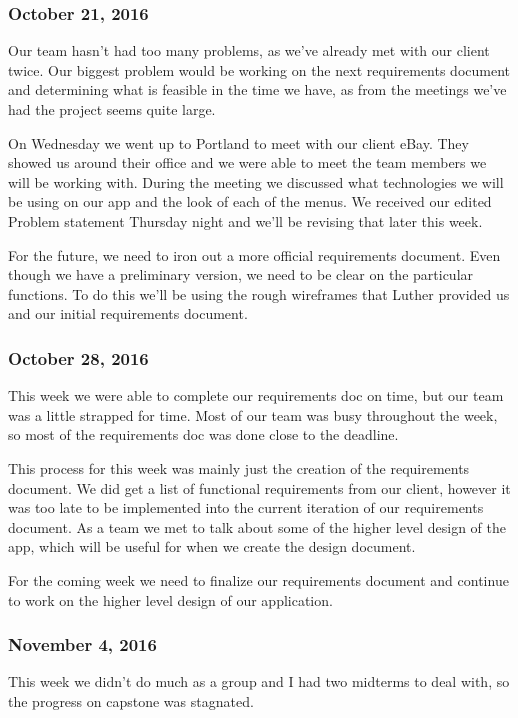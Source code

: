 \subsubsection{October 21, 2016}\label{section}
Our team hasn't had too many problems, as we've already met with our
client twice. Our biggest problem would be working on the next
requirements document and determining what is feasible in the time we
have, as from the meetings we've had the project seems quite large.

On Wednesday we went up to Portland to meet with our client eBay. They
showed us around their office and we were able to meet the team members
we will be working with. During the meeting we discussed what
technologies we will be using on our app and the look of each of the
menus. We received our edited Problem statement Thursday night and we'll
be revising that later this week.

For the future, we need to iron out a more official requirements
document. Even though we have a preliminary version, we need to be clear
on the particular functions. To do this we'll be using the rough
wireframes that Luther provided us and our initial requirements
document.

\subsubsection{October 28, 2016}\label{section}
This week we were able to complete our requirements doc on time, but our
team was a little strapped for time. Most of our team was busy
throughout the week, so most of the requirements doc was done close to
the deadline.

This process for this week was mainly just the creation of the
requirements document. We did get a list of functional requirements from
our client, however it was too late to be implemented into the current
iteration of our requirements document. As a team we met to talk about
some of the higher level design of the app, which will be useful for
when we create the design document.

For the coming week we need to finalize our requirements document and
continue to work on the higher level design of our application.

\subsubsection{November 4, 2016}\label{section}
This week we didn't do much as a group and I had two midterms to deal
with, so the progress on capstone was stagnated.

